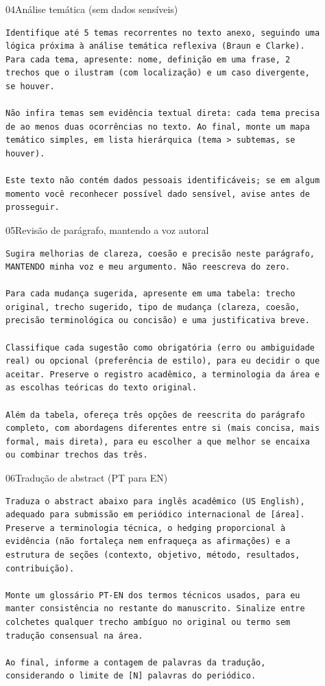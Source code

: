 \documentclass[11pt,a4paper]{article}
\begin{document}
\begin{modelo}{04}{Análise temática (sem dados sensíveis)}
\begin{lstlisting}
Identifique até 5 temas recorrentes no texto anexo, seguindo uma
lógica próxima à análise temática reflexiva (Braun e Clarke).
Para cada tema, apresente: nome, definição em uma frase, 2
trechos que o ilustram (com localização) e um caso divergente,
se houver.

Não infira temas sem evidência textual direta: cada tema precisa
de ao menos duas ocorrências no texto. Ao final, monte um mapa
temático simples, em lista hierárquica (tema > subtemas, se
houver).

Este texto não contém dados pessoais identificáveis; se em algum
momento você reconhecer possível dado sensível, avise antes de
prosseguir.
\end{lstlisting}
\end{modelo}

\begin{modelo}{05}{Revisão de parágrafo, mantendo a voz autoral}
\begin{lstlisting}
Sugira melhorias de clareza, coesão e precisão neste parágrafo,
MANTENDO minha voz e meu argumento. Não reescreva do zero.

Para cada mudança sugerida, apresente em uma tabela: trecho
original, trecho sugerido, tipo de mudança (clareza, coesão,
precisão terminológica ou concisão) e uma justificativa breve.

Classifique cada sugestão como obrigatória (erro ou ambiguidade
real) ou opcional (preferência de estilo), para eu decidir o que
aceitar. Preserve o registro acadêmico, a terminologia da área e
as escolhas teóricas do texto original.

Além da tabela, ofereça três opções de reescrita do parágrafo
completo, com abordagens diferentes entre si (mais concisa, mais
formal, mais direta), para eu escolher a que melhor se encaixa
ou combinar trechos das três.
\end{lstlisting}
\end{modelo}

\begin{modelo}{06}{Tradução de abstract (PT para EN)}
\begin{lstlisting}
Traduza o abstract abaixo para inglês acadêmico (US English),
adequado para submissão em periódico internacional de [área].
Preserve a terminologia técnica, o hedging proporcional à
evidência (não fortaleça nem enfraqueça as afirmações) e a
estrutura de seções (contexto, objetivo, método, resultados,
contribuição).

Monte um glossário PT-EN dos termos técnicos usados, para eu
manter consistência no restante do manuscrito. Sinalize entre
colchetes qualquer trecho ambíguo no original ou termo sem
tradução consensual na área.

Ao final, informe a contagem de palavras da tradução,
considerando o limite de [N] palavras do periódico.
\end{lstlisting}
\end{modelo}
\end{document}
